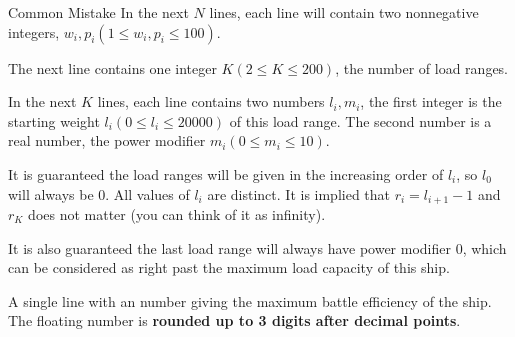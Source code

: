 \begin{problem}{Common Mistake}
In the next $N$ lines, each line will contain two nonnegative integers,
$w_i, p_i (1 \le w_i, p_i \le 100)$.

The next line contains one integer $K(2\le K \le 200)$, 
the number of load ranges.

In the next $K$ lines, each line contains two numbers $l_i, m_i$, the 
first integer is the starting weight $l_i (0 \le l_i \le 20000)$ of this load 
range.
The second number is a real number, the power modifier $m_i (0 \le m_i \le 10)$.

It is guaranteed the load ranges will be given in the increasing order 
of $l_i$, so $l_0$ will always be 0. All values of $l_i$ are distinct. It is implied that $r_i = l_{i+1} - 1$ and $r_K$ does not matter (you can think of it as infinity). 

It is also guaranteed the last load range will always have power modifier $0$, 
which can be considered as right past the maximum load capacity of this ship.

\OutputFile

A single line with an number giving the maximum battle efficiency of the ship.
The floating number is \textbf{rounded up to 3 digits after decimal points}. 

\Examples

\begin{example}
%
%
\end{example}
\end{problem}
